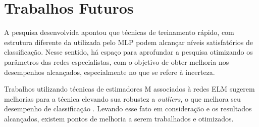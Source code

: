 %
%


\section{Trabalhos Futuros}

A pesquisa desenvolvida apontou que técnicas de treinamento rápido, com estrutura diferente da utilizada pelo MLP podem alcançar níveis satisfatórios de classificação. Nesse sentido, há espaço para aprofundar a pesquisa otimizando os parâmetros das redes especialistas, com o objetivo de obter melhoria nos desempenhos alcançados, especialmente no que se refere à incerteza.

Trabalhos utilizando técnicas de estimadores M associados à redes ELM  sugerem melhorias para a técnica elevando sua robustez a \textit{outliers}, o que melhora seu desempenho de classificação \cite{barreto2016}. Levando esse fato em consideração e os resultados alcançados, existem pontos de melhoria a serem trabalhados e otimizados.

